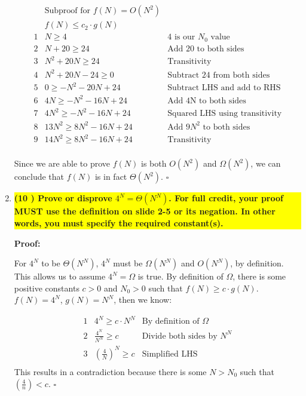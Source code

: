 \documentclass[12pt]{article}
\newcommand{\qed}{\hfill$\square$}
\newcommand{\pbStatement}[2]{
  \colorbox{yellow}{\parbox[t]{0.93\textwidth}
        {\bf (#1 \ifthenelse{#1 > 1}{points}{point})
 #2}}}
\begin{document}
\begin{enumerate}
    \begin{eqnarray*}
        & \text{Subproof for } f(N) = O(N^2) & \\
        & f(N) \leq c_2 \cdot g(N) & \\
        1 & N \geq 4 & \text{4 is our } N_0 \text{ value} \\
        2 & N + 20 \geq 24 & \text{Add 20 to both sides} \\
        3 & N^2 + 20N \geq 24 & \text{Transitivity} \\
        4 & N^2 + 20N -24 \geq 0 & \text{Subtract 24 from both sides} \\
        5 & 0 \geq -N^2 -20N +24 & \text{Subtract LHS and add to RHS} \\
        6 & 4N \geq -N^2 -16N +24 & \text{Add 4N to both sides} \\
        7 & 4N^2 \geq -N^2 -16N +24 & \text{Squared LHS using transitivity} \\
        8 & 13N^2 \geq 8N^2 -16N +24 & \text{Add }9N^2 \text{ to both sides} \\
        9 & 14N^2 \geq 8N^2 -16N +24 & \text{Transitivity} \\
    \end{eqnarray*}
    
        Since we are able to prove $f(N)$ is both $O(N^2)$ and $\Omega(N^2)$, we can conclude that $f(N)$ is in fact $\Theta(N^2)$. \qed

   \item                            %
     \pbStatement{10}{Prove or disprove $4^N=\Theta(N^N)$. For full credit,
     your proof MUST use the definition on slide 2-5 or its negation. In other
     words, you must specify the required constant(s).}

   {\bf Proof:}

    For $4^N$ to be $\Theta(N^N)$, $4^N$ must be $\Omega(N^N)$ and $O(N^N)$, by definition. This allows us to assume $4^N=\Omega$ is true. By definition of $\Omega$, there is some positive constants $c>0$ and $N_0>0$ such that $f(N)\geq c \cdot g(N)$.
    $f(N)=4^N$, $g(N)=N^N$, then we know:
    
    \begin{eqnarray*}
    1 & 4^N \geq c \cdot N^N & \text{By definition of $\Omega$} \\
    2 & \frac{4^N}{N^N} \geq c & \text{Divide both sides by } N^N \\
    3 & (\frac{4}{N})^N \geq c & \text{Simplified LHS} \\
    \end{eqnarray*}
    This results in a contradiction because there is some $N > N_0$ such that $(\frac{4}{n})<c$. \qed


\end{enumerate}
\end{document}
